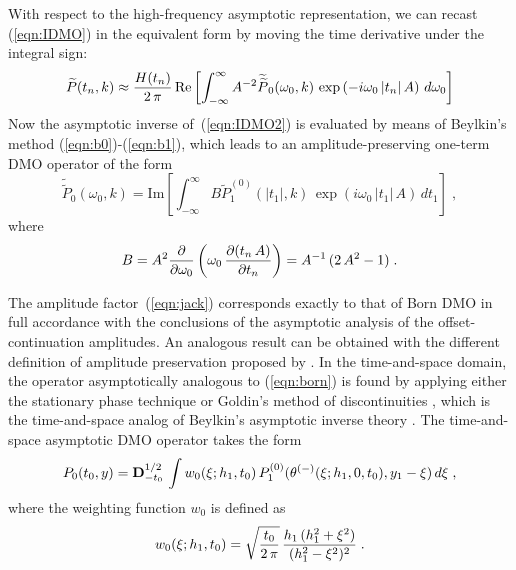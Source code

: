 With respect to the high-frequency asymptotic representation, we can
recast (\ref{eqn:IDMO}) in the equivalent form by moving the time
derivative under the integral sign:
\begin{equation}
\widetilde{P}(t_n,k) \approx 
{H(t_n) \over {2\,\pi}}\,\mbox{Re}\left[
\int_{-\infty}^{\infty}A^{-2}
\widetilde{\widetilde{P}}_0(\omega_0,k)\, 
\exp\left(-i \omega_0\,|t_n|\,A\right)
\,d\omega_0\right]
\label{eqn:IDMO2} 
\end{equation}
Now the asymptotic inverse of~(\ref{eqn:IDMO2}) is evaluated by
means of Beylkin's method (\ref{eqn:b0})-(\ref{eqn:b1}), which leads
to an amplitude-preserving one-term DMO operator of the form
\begin{equation}
\widetilde{\widetilde{P}}_0(\omega_0,k)  = 
\mbox{Im}\left[
\int_{-\infty}^{\infty} B
\widetilde{P}^{(0)}_1\left(\left|t_1\right|,k\right)\,
\exp\left(i \omega_0\,|t_1|\,A\right)
\,dt_1\right]\;,
\label{eqn:born} 
\end{equation}
where 
\begin{equation}
B = A^2 {\partial \over \partial \omega_0}\left(\omega_0\,
{{\partial (t_n\,A)} \over \partial t_n}\right) = 
A^{-1}\,(2\,A^2 - 1)\;.
\label{eqn:jack} 
\end{equation}
  
The amplitude factor~(\ref{eqn:jack}) corresponds exactly to that of
Born DMO \cite[]{born} in full accordance with the conclusions of the
asymptotic analysis of the offset-continuation amplitudes. An
analogous result can be obtained with the different definition of
amplitude preservation proposed by \cite{GEO58-01-00470066}. In
the time-and-space domain, the operator asymptotically analogous to
(\ref{eqn:born}) is found by applying either the stationary phase
technique \cite[]{GEO55-05-05950607,GEO58-01-00470066} or Goldin's method of
discontinuities \cite[]{goldintomo,Goldin.sep.67.171}, which is the
time-and-space analog of Beylkin's asymptotic inverse theory
\cite[]{stovas}. The time-and-space asymptotic DMO operator takes the
form
\begin{equation}
P_0(t_0,y) = {\bf D}^{1/2}_{-t_0}\,\int w_0(\xi;h_1,t_0)\,
P^{(0)}_1(\theta^{(-)}(\xi;h_1,0,t_0),y_1-\xi)\,d\xi\;,
\label{eqn:TADMO}
\end{equation} 
where the weighting function $w_0$ is defined as 
\begin{equation}
w_0(\xi;h_1,t_0)=\sqrt{t_0 \over {2\,\pi}}\, 
{{h_1\,(h_1^2+\xi^2)} \over (h_1^2-\xi^2)^2}\;.
\label{eqn:TAw}
\end{equation}

